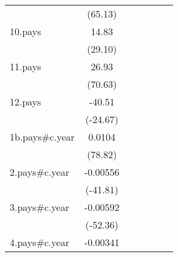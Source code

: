{\begin{tabular}{l*{6}{c}}
                    &     (65.13)         &                     &                     &                     &                     &                     \\
[1em]
10.pays             &       14.83\sym{***}&                     &                     &                     &                     &                     \\
                    &     (29.10)         &                     &                     &                     &                     &                     \\
[1em]
11.pays             &       26.93\sym{***}&                     &                     &                     &                     &                     \\
                    &     (70.63)         &                     &                     &                     &                     &                     \\
[1em]
12.pays             &      -40.51\sym{***}&                     &                     &                     &                     &                     \\
                    &    (-24.67)         &                     &                     &                     &                     &                     \\
[1em]
1b.pays#c.year      &      0.0104\sym{***}&                     &                     &                     &                     &                     \\
                    &     (78.82)         &                     &                     &                     &                     &                     \\
[1em]
2.pays#c.year       &    -0.00556\sym{***}&                     &                     &                     &                     &                     \\
                    &    (-41.81)         &                     &                     &                     &                     &                     \\
[1em]
3.pays#c.year       &    -0.00592\sym{***}&                     &                     &                     &                     &                     \\
                    &    (-52.36)         &                     &                     &                     &                     &                     \\
[1em]
4.pays#c.year       &    -0.00341\sym{***}&                     &                     &                     &                     &                     \\

\end{tabular}}
